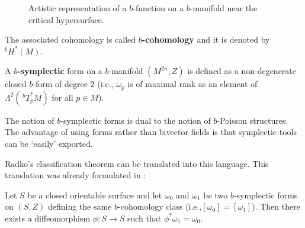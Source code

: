 \begin{figure}
\caption{Artistic representation of a $b$-function on a $b$-manifold  near the critical hypersurface.} \label{fig:L1}
\end{figure}





The associated cohomology is called \textbf{$b$-cohomology} and it is denoted by \textbf{$^b H^*(M)$}.

\begin{definition}
A \textbf{$b$-symplectic} form on a $b$-manifold $(M^{2n},Z)$ is defined as a non-degenerate closed $b$-form of degree $2$ (i.e., $\omega_p$ is of maximal rank as an element of $\Lambda^2(\,^b T_p^* M)$ for all $p\in M$).
\end{definition}

The notion {of} $b$-symplectic forms is dual to {the} notion of $b$-Poisson structures. The advantage of using forms rather than bivector fields is that symplectic tools can be `easily' exported.

Radko's classification theorem \cite{Radko02} can be translated  into this language. {This translation was already formulated in} \cite{GMP10}:

 \begin{theorem} Let $S$ be a {closed} orientable surface and  let  $\omega_0$ and $\omega_1$ be two $b$-symplectic forms on {$(S,Z)$}  defining the same $b$-cohomology class (i.e.,$[\omega_0]= [\omega_1]$).  Then there exists a diffeomorphism {$\phi:S\rightarrow S$} such that $\phi^*\omega_1 = \omega_0$.
\end{theorem}

